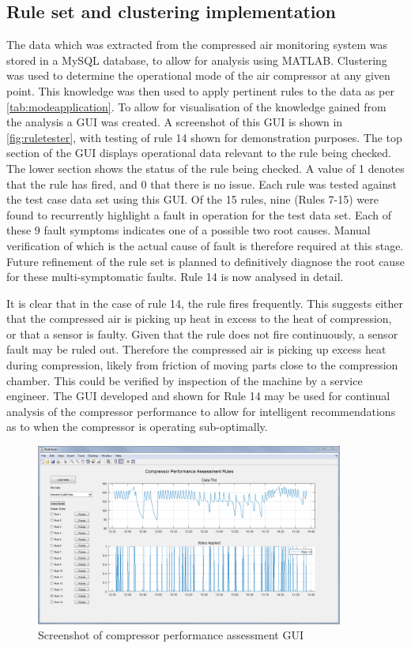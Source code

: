 \subsection{Rule set and clustering implementation}
The data which was extracted from the compressed air monitoring system was stored in a MySQL database, to allow for analysis using MATLAB. Clustering was used to determine the operational mode of the air compressor at any given point. This knowledge was then used to apply pertinent rules to the data as per \autoref{tab:modeapplication}. To allow for visualisation of the knowledge gained from the analysis a GUI was created. A screenshot of this GUI is shown in \autoref{fig:ruletester}, with testing of rule 14 shown for demonstration purposes. The top section of the GUI displays operational data relevant to the rule being checked. The lower section shows the status of the rule being checked. A value of 1 denotes that the rule has fired, and 0 that there is no issue. Each rule was tested against the test case data set using this GUI. Of the 15 rules, nine (Rules 7-15) were found to recurrently highlight a fault in operation for the test data set. Each of these 9 fault symptoms indicates one of a possible two root causes. Manual verification of which is the actual cause of fault is therefore required at this stage. Future refinement of the rule set is planned to definitively diagnose the root cause for these multi-symptomatic faults. Rule 14 is now analysed in detail.

It is clear that in the case of rule 14, the rule fires frequently. This suggests either that the compressed air is picking up heat in excess to the heat of compression, or that a sensor is faulty. Given that the rule does not fire continuously, a sensor fault may be ruled out. Therefore the compressed air is picking up excess heat during compression, likely from friction of moving parts close to the compression chamber. This could be verified by inspection of the machine by a service engineer. The GUI developed and shown for Rule 14 may be used for continual analysis of the compressor performance to allow for intelligent recommendations as to when the compressor is operating sub-optimally.

\begin{figure}
\includegraphics[width = 0.9\textwidth]{./Images/RuleTester.png}
\caption{Screenshot of compressor performance assessment GUI}
\label{fig:ruletester}
\end{figure}


